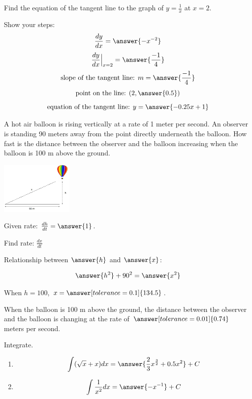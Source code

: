 \documentclass{ximera}
\begin{document}
\begin{problem}\label{prob:mth240finalprob4}
Find the equation of the tangent line to the graph of $y=\frac{1}{x}$ at $x=2$.

Show your steps:
$$\frac{dy}{dx}=\answer{-x^{-2}}$$
$$\frac{dy}{dx}\Big|_{x=2}=\answer{\frac{-1}{4}}$$
$$\mbox{slope of the tangent line: }m=\answer{\frac{-1}{4}}$$
$$\mbox{point on the line: }(2, \answer{0.5})$$
$$\mbox{equation of the tangent line: }y=\answer{-0.25x+1}$$
\end{problem}

\begin{problem}\label{prob:mth240finalprob5}
A hot air balloon is rising vertically at a rate of 1 meter per second.  An observer is standing 90 meters away from the point directly underneath the balloon.  How fast is the distance between the observer and the balloon increasing when the balloon is 100 m above the ground.

\begin{image}
   
\includegraphics[height=1in]{240finalimage2.jpg}

\end{image}

Given rate: $\frac{dh}{dt}=\answer{1}$.

Find rate:  $\frac{dx}{dt}$

Relationship between $\answer{h}$ and $\answer{x}$:

$$\answer{h^2}+90^2=\answer{x^2}$$

When $h=100$, $x=\answer[tolerance=0.1]{134.5}$.

When the balloon is 100 m above the ground, the distance between the observer and the balloon is changing at the rate of $\answer[tolerance=0.01]{0.74}$ meters per second.
\end{problem}

\begin{problem}\label{prob:mth240finalprob6}
Integrate.
  \begin{enumerate}
\item
$$\int (\sqrt{x}+x)dx=\answer{\frac{2}{3}x^{\frac{3}{2}}+0.5x^2}+C$$

\item
$$\int \frac{1}{x^2}dx=\answer{-x^{-1}}+C$$
\end{enumerate}
\end{problem}
\end{document}
